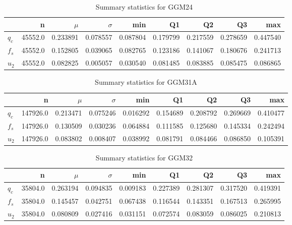 \begin{table}[h]
\caption{Summary statistics for GGM24}
\begin{tabular}{lrrrrrrrr}
\toprule
{} &        n &     $\mu$ &  $\sigma$ &       min &        Q1 &        Q2 &        Q3 &       max \\
\midrule
$q_c$ &  45552.0 &  0.233891 &  0.078557 &  0.087804 &  0.179799 &  0.217559 &  0.278659 &  0.447540 \\
$f_s$ &  45552.0 &  0.152805 &  0.039065 &  0.082765 &  0.123186 &  0.141067 &  0.180676 &  0.241713 \\
$u_2$ &  45552.0 &  0.082825 &  0.005057 &  0.030540 &  0.081485 &  0.083885 &  0.085475 &  0.086865 \\
\bottomrule
\end{tabular}
\end{table}

\begin{table}[h]
\caption{Summary statistics for GGM31A}
\begin{tabular}{lrrrrrrrr}
\toprule
{} &         n &     $\mu$ &  $\sigma$ &       min &        Q1 &        Q2 &        Q3 &       max \\
\midrule
$q_c$ &  147926.0 &  0.213471 &  0.075246 &  0.016292 &  0.154689 &  0.208792 &  0.269669 &  0.410477 \\
$f_s$ &  147926.0 &  0.130509 &  0.030236 &  0.064884 &  0.111585 &  0.125680 &  0.145334 &  0.242494 \\
$u_2$ &  147926.0 &  0.083802 &  0.008407 &  0.038992 &  0.081791 &  0.084466 &  0.086850 &  0.105391 \\
\bottomrule
\end{tabular}
\end{table}

\begin{table}[h]
\caption{Summary statistics for GGM32}
\begin{tabular}{lrrrrrrrr}
\toprule
{} &        n &     $\mu$ &  $\sigma$ &       min &        Q1 &        Q2 &        Q3 &       max \\
\midrule
$q_c$ &  35804.0 &  0.263194 &  0.094835 &  0.009183 &  0.227389 &  0.281307 &  0.317520 &  0.419391 \\
$f_s$ &  35804.0 &  0.145457 &  0.042751 &  0.067438 &  0.116544 &  0.143351 &  0.167513 &  0.265995 \\
$u_2$ &  35804.0 &  0.080809 &  0.027416 &  0.031151 &  0.072574 &  0.083059 &  0.086025 &  0.210813 \\
\bottomrule
\end{tabular}
\end{table}

